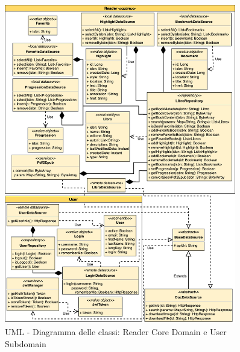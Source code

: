 \begin{figure}[H]
\centering
\includegraphics[width=0.9\textwidth]{img/tesi-25-ddd.drawio.png}
\caption{UML - Diagramma delle classi: Reader Core Domain e User Subdomain}
\label{fig:5.4}
\end{figure}


